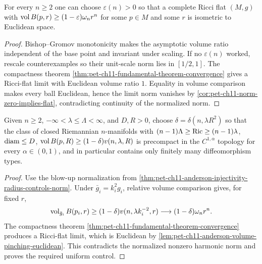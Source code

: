 \begin{lemma}
  \label{lem:pet-ch11-anderson-volume-pinching-euclidean}
  For every $n\ge2$ one can choose $\varepsilon(n)>0$ so that a complete Ricci
  flat $(M,g)$ with $\operatorname{vol} B(p,r)\ge(1-\varepsilon)\omega_nr^n$ for some
  $p\in M$ and some $r$ is isometric to Euclidean space.
\end{lemma}
\begin{proof}
  \sketch
  Bishop--Gromov monotonicity makes the asymptotic volume ratio independent of the base point and invariant under scaling. If no \(\varepsilon(n)\) worked, rescale counterexamples so their unit-scale norm lies in \([1/2,1]\). The compactness theorem \cref{thm:pet-ch11-fundamental-theorem-convergence} gives a Ricci-flat limit with Euclidean volume ratio \(1\). Equality in volume comparison makes every ball Euclidean, hence the limit norm vanishes by \cref{cor:pet-ch11-norm-zero-implies-flat}, contradicting continuity of the normalized norm.
\end{proof}


\begin{corollary}
  \label{cor:pet-ch11-volume-pinching-precompactness}
  Given $n\ge2$, $-\infty<\lambda\le\Lambda<\infty$, and $D,R>0$, choose
  $\delta=\delta(n,\lambda R^2)$ so that the class of closed Riemannian
  $n$-manifolds with $(n-1)\Lambda\ge\operatorname{Ric}\ge(n-1)\lambda$, $\operatorname{diam}\le D$,
  $\operatorname{vol} B(p,R)\ge(1-\delta)v(n,\lambda,R)$ is precompact in the $C^{1,\alpha}$
  topology for every $\alpha\in(0,1)$, and in particular contains only
  finitely many diffeomorphism types.
\end{corollary}
\begin{proof}
  \sketch
  Use the blow-up normalization from \cref{thm:pet-ch11-anderson-injectivity-radius-controls-norm}. Under \(\bar g_i=k_i^2g_i\), relative volume comparison gives, for fixed \(r\),
  \[
    \operatorname{vol}_{\bar g_i}B(p_i,r)\ge(1-\delta)v(n,\lambda k_i^{-2},r)
      \longrightarrow(1-\delta)\omega_nr^n .
  \]
  The compactness theorem \cref{thm:pet-ch11-fundamental-theorem-convergence} produces a Ricci-flat limit, which is Euclidean by \cref{lem:pet-ch11-anderson-volume-pinching-euclidean}. This contradicts the normalized nonzero harmonic norm and proves the required uniform control.
\end{proof}



